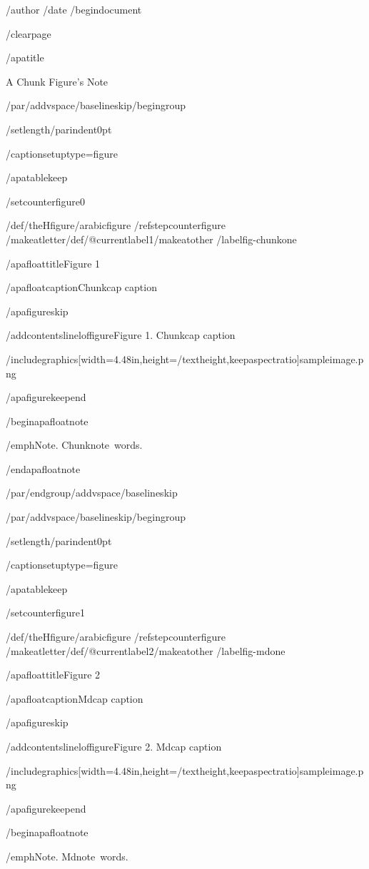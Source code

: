 /author{}
/date{}
/begin{document}


/clearpage

/apatitle{

A Chunk Figure's Note

}

/par/addvspace{/baselineskip}/begingroup

/setlength{/parindent}{0pt}

/captionsetup{type=figure}

/apatablekeep

/setcounter{figure}{0}

/def/theHfigure{/arabic{figure}}%
/refstepcounter{figure}%
/makeatletter/def/@currentlabel{1}/makeatother%
/label{fig-chunkone}

/apafloattitle{Figure 1}

/apafloatcaption{Chunkcap caption}

/apafigureskip

/addcontentsline{lof}{figure}{Figure 1. Chunkcap caption}

/includegraphics[width=4.48in,height=/textheight,keepaspectratio]{sampleimage.png}

/apafigurekeepend

/begin{apafloatnote}

/emph{Note}. Chunknote~words.

/end{apafloatnote}

/par/endgroup/addvspace{/baselineskip}

/par/addvspace{/baselineskip}/begingroup

/setlength{/parindent}{0pt}

/captionsetup{type=figure}

/apatablekeep

/setcounter{figure}{1}

/def/theHfigure{/arabic{figure}}%
/refstepcounter{figure}%
/makeatletter/def/@currentlabel{2}/makeatother%
/label{fig-mdone}

/apafloattitle{Figure 2}

/apafloatcaption{Mdcap caption}

/apafigureskip

/addcontentsline{lof}{figure}{Figure 2. Mdcap caption}

/includegraphics[width=4.48in,height=/textheight,keepaspectratio]{sampleimage.png}

/apafigurekeepend

/begin{apafloatnote}

/emph{Note}. Mdnote~words.

